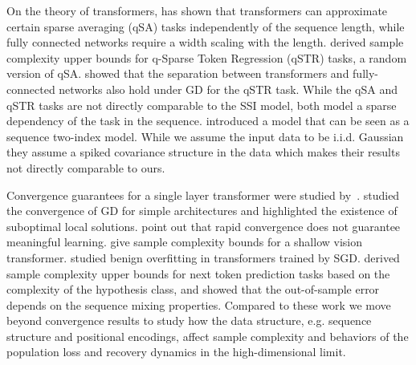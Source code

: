 On the theory of transformers, \cite{sanford2023representational} has shown that transformers can approximate certain sparse averaging (qSA) tasks independently of the sequence length, while fully connected networks require a width scaling with the length. \cite{mousavihosseini2025when} derived sample complexity upper bounds for q-Sparse Token Regression (qSTR) tasks, a random version of qSA. \cite{wang2024transformers} showed that the separation between transformers and fully-connected networks also hold under GD for the qSTR task. While the qSA and qSTR tasks are not directly comparable to the SSI model, both model a sparse dependency of the task in the sequence. \cite{marion2025attention} introduced a model that can be seen as a sequence two-index model. While we assume the input data to be i.i.d. Gaussian they assume a spiked covariance structure in the data which makes their results not directly comparable to ours. 

Convergence guarantees for a single layer transformer were studied by~\cite{wu2023convergence}. \cite{song2024unraveling} studied the convergence of GD for simple architectures and highlighted the existence of suboptimal local solutions. 
\cite{li2025optimization} point out that rapid convergence does not guarantee meaningful learning.  \cite{li2023theoretical} give sample complexity bounds for a shallow vision transformer. \cite{zhang2025understanding} studied benign overfitting in transformers trained by SGD. \cite{yuksel2025sample} derived sample complexity upper bounds for next token prediction tasks based on the complexity of the hypothesis class, and showed that the out-of-sample error depends on the sequence mixing properties. Compared to these work we move beyond convergence results to study how the data structure, e.g. sequence structure and positional encodings, affect sample complexity and behaviors of the population loss and recovery dynamics in the high-dimensional limit.
